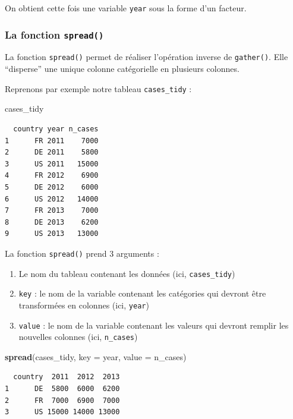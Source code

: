 \documentclass[a4paperpaper,]{article}
\newenvironment{Shaded}{\begin{snugshade}}{\end{snugshade}}
\newcommand{\DataTypeTok}[1]{\textcolor[rgb]{0.00,0.34,0.68}{#1}}
\newcommand{\KeywordTok}[1]{\textcolor[rgb]{0.12,0.11,0.11}{\textbf{#1}}}
\newcommand{\NormalTok}[1]{\textcolor[rgb]{0.12,0.11,0.11}{#1}}
\providecommand{\tightlist}{%
  \setlength{\itemsep}{0pt}\setlength{\parskip}{0pt}}
\begin{document}
On obtient cette fois une variable \texttt{year} sous la forme d'un facteur.

\hypertarget{spread}{%
\subsubsection{\texorpdfstring{La fonction \texttt{spread()}}{La fonction spread()}}\label{spread}}

La fonction \texttt{spread()} permet de réaliser l'opération inverse de \texttt{gather()}. Elle ``disperse'' une unique colonne catégorielle en plusieurs colonnes.

Reprenons par exemple notre tableau \texttt{cases\_tidy} :

\begin{Shaded}
\begin{Highlighting}[]
\NormalTok{cases_tidy}
\end{Highlighting}
\end{Shaded}

\begin{verbatim}
  country year n_cases
1      FR 2011    7000
2      DE 2011    5800
3      US 2011   15000
4      FR 2012    6900
5      DE 2012    6000
6      US 2012   14000
7      FR 2013    7000
8      DE 2013    6200
9      US 2013   13000
\end{verbatim}

La fonction \texttt{spread()} prend 3 arguments :

\begin{enumerate}
\def\labelenumi{\arabic{enumi}.}
\tightlist
\item
  Le nom du tableau contenant les données (ici, \texttt{cases\_tidy})
\item
  \texttt{key} : le nom de la variable contenant les catégories qui devront être transformées en colonnes (ici, \texttt{year})
\item
  \texttt{value} : le nom de la variable contenant les valeurs qui devront remplir les nouvelles colonnes (ici, \texttt{n\_cases})
\end{enumerate}

\begin{Shaded}
\begin{Highlighting}[]
\KeywordTok{spread}\NormalTok{(cases_tidy, }\DataTypeTok{key =}\NormalTok{ year, }\DataTypeTok{value =}\NormalTok{ n_cases)}
\end{Highlighting}
\end{Shaded}

\begin{verbatim}
  country  2011  2012  2013
1      DE  5800  6000  6200
2      FR  7000  6900  7000
3      US 15000 14000 13000
\end{verbatim}
\end{document}
